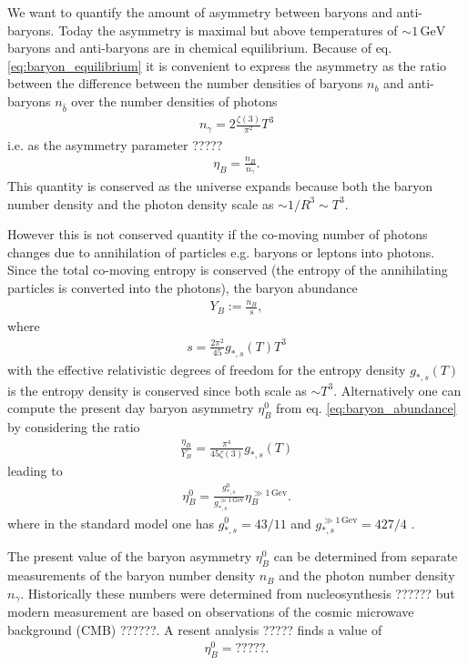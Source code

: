 \documentclass[13pt,a4paper,twoside,titlepage]{article}
\begin{document}
We want to quantify the amount of asymmetry between baryons and anti-baryons.
Today the asymmetry is maximal but
above temperatures of $\sim 1 \, \mathrm{GeV}$ baryons and anti-baryons are in chemical equilibrium.
Because of eq. \eqref{eq:baryon_equilibrium} it is convenient to express the asymmetry as
the ratio between the difference between the number densities of baryons $n_b$ and anti-baryons $n_{\hat{b}}$
over the number densities of photons \cite[eq. 3.52]{the_early_universe_kolb_and_turner}
\begin{align}
    n_\gamma = 2 \frac{\zeta(3)}{\pi^2} T^3
\end{align}
i.e. as the asymmetry parameter ?????
\begin{align}
    \eta_B = \frac{n_B}{n_\gamma}.
\end{align}
This quantity is conserved as the universe expands because both the baryon number density
and the photon density scale as $\sim 1/R^3 \sim T^3$.

However this is not conserved quantity if the co-moving number of photons changes due to annihilation
of particles e.g. baryons or leptons into photons.
Since the total co-moving entropy is conserved (the entropy of the annihilating particles is converted into the photons), the baryon abundance
\begin{align}
    \label{eq:baryon_abundance}
    Y_B := \frac{n_B}{s},
\end{align}
where
\begin{align}
    s = \frac{2 \pi^2}{45} g_{*, s}(T) T^3
\end{align}
with the effective relativistic degrees of freedom for the entropy density $g_{*, s}(T)$
is the entropy density
is conserved since both scale as $\sim T^3$.
Alternatively one can compute the present day baryon asymmetry $\eta_B^0$ from eq. \eqref{eq:baryon_abundance} by considering the ratio
\begin{align}
    \frac{\eta_B}{Y_B} = \frac{\pi^4}{45 \zeta(3)} g_{*, s}(T)
\end{align}
leading to
\begin{align}
    \eta_B^0 = \frac{g_{*,s}^0}{g_{*, s}^{\gg 1 \, \mathrm{Gev}}} \eta_B^{\gg 1 \, \mathrm{Gev}}.
\end{align}
where in the standard model one has $g_{*,s}^0 = 43/11$ and $g_{*, s}^{\gg 1 \, \mathrm{Gev}} = 427/4$ \cite[sec. 3.4]{the_early_universe_kolb_and_turner}.

The present value of the baryon asymmetry $\eta_B^0$ can be determined from separate measurements
of the baryon number density $n_B$ and the photon number density $n_\gamma$.
Historically these numbers were determined from nucleosynthesis ?????? but modern measurement are based on observations of the cosmic microwave background (CMB) ??????.
A resent analysis ????? finds a value of
\begin{align}
    \eta_B^0 = ?????.
\end{align}
\end{document}
